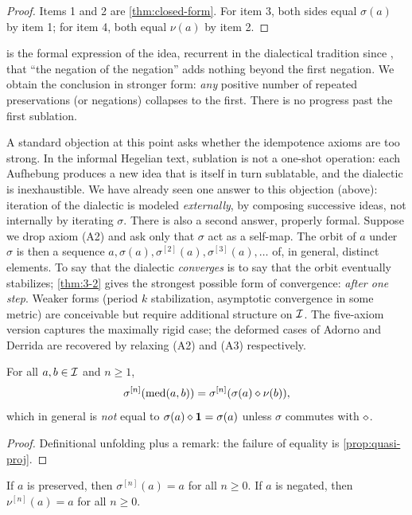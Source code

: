 \begin{proof}
Items 1 and 2 are \cref{thm:closed-form}. For item 3, both sides
equal $\sigma(a)$ by item 1; for item 4, both equal $\nu(a)$ by
item 2.
\end{proof}

 is the formal expression of the idea, recurrent in
the dialectical tradition since \citet{Adorno1966}, that ``the
negation of the negation'' adds nothing beyond the first negation.
We obtain the conclusion in stronger form: \emph{any} positive number
of repeated preservations (or negations) collapses to the first.
There is no progress past the first sublation.

A standard objection at this point asks whether the idempotence
axioms are too strong. In the informal Hegelian text, sublation is
not a one-shot operation: each Aufhebung produces a new idea that is
itself in turn sublatable, and the dialectic is inexhaustible. We
have already seen one answer to this objection (above): iteration of
the dialectic is modeled \emph{externally}, by composing successive
ideas, not internally by iterating $\sigma$. There is also a second
answer, properly formal. Suppose we drop axiom (A2) and ask only
that $\sigma$ act as a self-map. The orbit of $a$ under $\sigma$ is
then a sequence $a,\sigma(a),\sigma^{[2]}(a),\sigma^{[3]}(a),\ldots$
of, in general, distinct elements. To say that the dialectic
\emph{converges} is to say that the orbit eventually stabilizes;
\cref{thm:3-2} gives the strongest possible form of convergence:
\emph{after one step}. Weaker forms (period $k$ stabilization,
asymptotic convergence in some metric) are conceivable but require
additional structure on $\mathcal{I}$. The five-axiom version captures the
maximally rigid case; the deformed cases of Adorno and Derrida are
recovered by relaxing (A2) and (A3) respectively.

\begin{proposition}\label{prop:mediated-iter}
For all $a,b\in\mathcal{I}$ and $n\geq 1$,
\[
\sigma^{[n]}(\mathrm{med}(a,b))=\sigma^{[n]}(\sigma(a)\mathbin{\diamond}\nu(b)),
\]
which in general is \emph{not} equal to $\sigma(a)\mathbin{\diamond}\mathbf{1}
=\sigma(a)$ unless $\sigma$ commutes with $\mathbin{\diamond}$.
\end{proposition}

\begin{proof}
Definitional unfolding plus a remark: the failure of equality is
\cref{prop:quasi-proj}.
\end{proof}

\begin{corollary}\label{cor:fixed-point-constancy}
If $a$ is preserved, then $\sigma^{[n]}(a)=a$ for all $n\geq 0$. If
$a$ is negated, then $\nu^{[n]}(a)=a$ for all $n\geq 0$.
\end{corollary}

